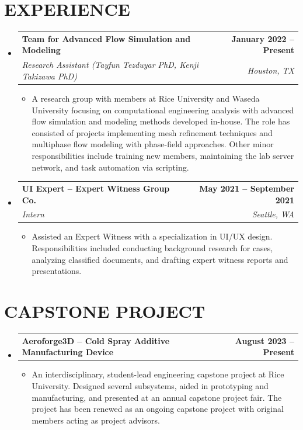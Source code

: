 \documentclass[letterpaper,11pt]{article}
\makeatletter
\newcommand{\resumeItem}[1]{
  \item \small{
    {#1 \vspace{-2pt}}
  }
}
\newcommand{\resumeSubheading}[4]{
  \vspace{-2pt}\item
    \begin{tabular*}{1.0\textwidth}[t]{l@{\extracolsep{\fill}}r}
      \textbf{#1} & \textbf{\small #2} \\
      \textit{\small#3} & \textit{\small #4} \\
    \end{tabular*}\vspace{-7pt}
}
\newcommand{\projectSubheading}[2]{
  \vspace{-2pt}\item
    \begin{tabular*}{1.0\textwidth}[t]{l@{\extracolsep{\fill}}r}
      \textbf{#1} & \textbf{\small #2} \\
    \end{tabular*}\vspace{-7pt}
}
\newcommand{\resumeSubHeadingListStart}{\begin{itemize}[leftmargin=0.0in, label={}]}
\newcommand{\resumeSubHeadingListEnd}{\end{itemize}}
\newcommand{\resumeItemListStart}{\begin{itemize}}
\newcommand{\resumeItemListEnd}{\end{itemize}\vspace{-5pt}}
\makeatother
\begin{document}
\section{EXPERIENCE}
  \resumeSubHeadingListStart

    \resumeSubheading
      {Team for Advanced Flow Simulation and Modeling}{January 2022 -- Present}
      {Research Assistant (Tayfun Tezduyar PhD, Kenji Takizawa PhD)}{Houston, TX}
      \resumeItemListStart
        \resumeItem{A research group with members at Rice University and Waseda University focusing on computational engineering analysis with advanced flow simulation and modeling methods developed in-house. The role has consisted of projects implementing mesh refinement techniques and multiphase flow modeling with phase-field approaches. Other minor responsibilities include training new members, maintaining the lab server network, and task automation via scripting.}
      \resumeItemListEnd   
    \vspace{-12pt}
    \resumeSubheading
      {UI Expert -- Expert Witness Group Co.}{May 2021 -- September 2021}
      {Intern}{Seattle, WA}
      \resumeItemListStart
        \resumeItem{Assisted an Expert Witness with a specialization in UI/UX design. Responsibilities included conducting background research for cases, analyzing classified documents, and drafting expert witness reports and presentations.}
      \resumeItemListEnd   
 
    \resumeSubHeadingListEnd
 \vspace{-16pt}

\section{CAPSTONE PROJECT}

    \resumeSubHeadingListStart
      \projectSubheading
        {Aeroforge3D -- Cold Spray Additive Manufacturing Device}{August 2023 -- Present}
        \resumeItemListStart
          \resumeItem{An interdisciplinary, student-lead engineering capstone project at Rice University. Designed several subsystems, aided in prototyping and manufacturing, and presented at an annual capstone project fair. The project has been renewed as an ongoing capstone project with original members acting as project advisors.}
        \resumeItemListEnd   
  \resumeSubHeadingListEnd
\vspace{-16pt}

\end{document}
